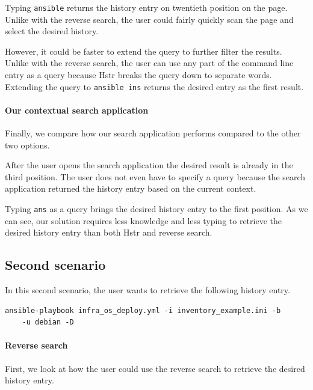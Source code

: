 Typing \verb|ansible| returns the history entry on twentieth position on the page. Unlike with the reverse search, the user could fairly quickly scan the page and select the desired history. 

However, it could be faster to extend the query to further filter the results. Unlike with the reverse search, the user can use any part of the command line entry as a query because Hstr breaks the query down to separate words. Extending the query to \verb|ansible ins| returns the desired entry as the first result.


\paragraph{Our contextual search application}
Finally, we compare how our search application performs compared to the other two options.

After the user opens the search application the desired result is already in the third position. The user does not even have to specify a query because the search application returned the history entry based on the current context.

Typing \verb|ans| as a query brings the desired history entry to the first position. As we can see, our solution requires less knowledge and less typing to retrieve the desired history entry than both Hstr and reverse search. 

\subsection{Second scenario}

In this second scenario, the user wants to retrieve the following history entry.

\begin{verbatim}
ansible-playbook infra_os_deploy.yml -i inventory_example.ini -b
    -u debian -D
\end{verbatim}


\paragraph{Reverse search} 
First, we look at how the user could use the reverse search to retrieve the desired history entry.

